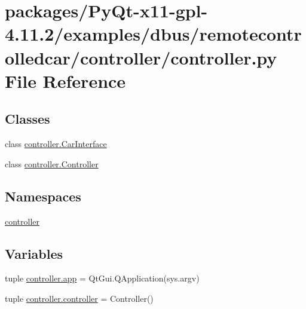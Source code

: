 \hypertarget{packages_2PyQt-x11-gpl-4_811_82_2examples_2dbus_2remotecontrolledcar_2controller_2controller_8py}{}\section{packages/\+Py\+Qt-\/x11-\/gpl-\/4.11.2/examples/dbus/remotecontrolledcar/controller/controller.py File Reference}
\label{packages_2PyQt-x11-gpl-4_811_82_2examples_2dbus_2remotecontrolledcar_2controller_2controller_8py}
\subsection*{Classes}
\begin{DoxyCompactItemize}
\item 
class \hyperlink{classcontroller_1_1CarInterface}{controller.\+Car\+Interface}
\item 
class \hyperlink{classcontroller_1_1Controller}{controller.\+Controller}
\end{DoxyCompactItemize}
\subsection*{Namespaces}
\begin{DoxyCompactItemize}
\item 
 \hyperlink{namespacecontroller}{controller}
\end{DoxyCompactItemize}
\subsection*{Variables}
\begin{DoxyCompactItemize}
\item 
tuple \hyperlink{namespacecontroller_a22cff99a2c1df93952e23e29a31cd3e2}{controller.\+app} = Qt\+Gui.\+Q\+Application(sys.\+argv)
\item 
tuple \hyperlink{namespacecontroller_aa816e713f879c6650f4301429c30f0b8}{controller.\+controller} = Controller()
\end{DoxyCompactItemize}
